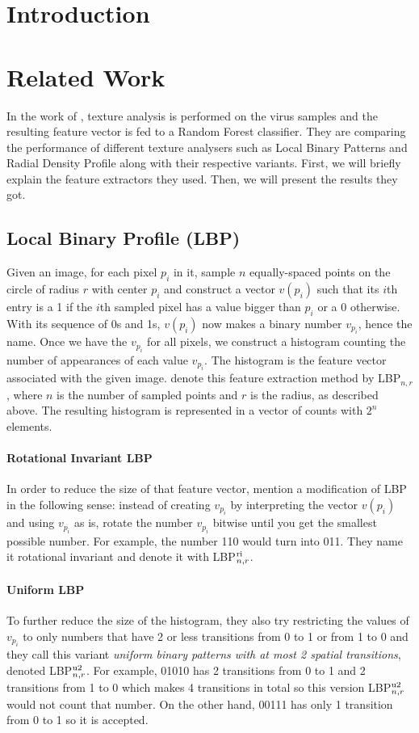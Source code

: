 \begin{multicols}{2}
\section{Introduction}
\section{Related Work}
In the work of \citet{kylberg2011virus}, texture analysis is performed on the virus samples and the resulting feature vector is fed to a Random Forest classifier. They are comparing the performance of different texture analysers such as Local Binary Patterns and Radial Density Profile along with their respective variants. First, we will briefly explain the feature extractors they used. Then, we will present the results they got. 
\subsection{Local Binary Profile (LBP)}
Given an image, for each pixel $p_i$ in it, sample $n$ equally-spaced points on the circle of radius $r$ with center $p_i$ and construct a vector $v(p_i)$ such that its $i$th entry is a 1 if the $i$th sampled pixel has a value bigger than $p_i$ or a 0 otherwise. With its sequence of 0s and 1s, $v(p_i)$ now makes a binary number $v_{p_i}$, hence the name. Once we have the $v_{p_i}$ for all pixels, we construct a histogram counting the number of appearances of each value $v_{p_i}$. The histogram is the feature vector associated with the given image. \citet{kylberg2011virus} denote this feature extraction method by LBP$_{n, r}$, where $n$ is the number of sampled points and $r$ is the radius, as described above. The resulting histogram is represented in a vector of counts with $2^n$ elements. 
\paragraph{Rotational Invariant LBP} In order to reduce the size of that feature vector, \citet{kylberg2011virus} mention a modification of LBP in the following sense: instead of creating $v_{p_i}$ by interpreting the vector $v(p_i)$ and using $v_{p_i}$ as is, rotate the number $v_{p_i}$ bitwise until you get the smallest possible number. For example, the number 110 would turn into 011. They name it rotational invariant and denote it with LBP$^{\textnormal{ri}}_{n,r}$.
\paragraph{Uniform LBP} To further reduce the size of the histogram, they also try restricting the values of $v_{p_i}$ to only numbers that have 2 or less transitions from 0 to 1 or from 1 to 0 and they call this variant \emph{uniform binary patterns with at most 2 spatial transitions}, denoted LBP$^{\textnormal{u2}}_{n,r}$. For example, 01010 has 2 transitions from 0 to 1 and 2 transitions from 1 to 0 which makes 4 transitions in total so this version LBP$^{\textnormal{u2}}_{n,r}$ would not count that number. On the other hand, 00111 has only 1 transition from 0 to 1 so it is accepted. 
\par 

\end{multicols}
